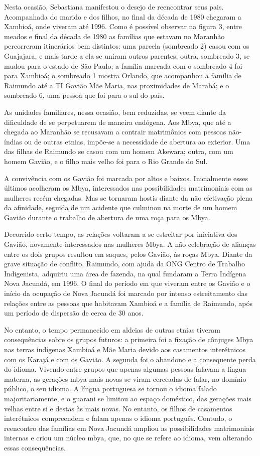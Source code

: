 Nesta ocasião, Sebastiana manifestou o desejo de reencontrar seus pais.
Acompanhada do marido e dos filhos, no final da década de 1980 chegaram
a Xambioá, onde viveram até 1996. Como é possível observar na figura 3,
entre meados e final da década de 1980 as famílias que estavam no
Maranhão percorreram itinerários bem distintos: uma parcela (sombreado
2) casou com os Guajajara, e mais tarde a ela se uniram outros parentes;
outra, sombreado 3, se mudou para o estado de São Paulo; a família
marcada com o sombreado 4 foi para Xambioá; o sombreado 1 mostra
Orlando, que acompanhou a família de Raimundo até a TI Gavião Mãe Maria,
nas proximidades de Marabá; e o sombreado 6, uma pessoa que foi para o
sul do país.

As unidades familiares, nessa ocasião, bem reduzidas, se veem diante da
dificuldade de se perpetuarem de maneira endógena. Aos Mbya, que até a
chegada ao Maranhão se recusavam a contrair matrimônios com pessoas
não-índias ou de outras etnias, impõe-se a necessidade de abertura ao
exterior. Uma das filhas de Raimundo se casou com um homem Akewara;
outra, com um homem Gavião, e o filho mais velho foi para o Rio Grande
do Sul.

A convivência com os Gavião foi marcada por altos e baixos. Inicialmente
esses últimos acolheram os Mbya, interessados nas possibilidades
matrimoniais com as mulheres recém chegadas. Mas se tornaram hostis
diante da não efetivação plena da afinidade, seguida de um acidente que
culminou na morte de um homem Gavião durante o trabalho de abertura de
uma roça para os Mbya.

Decorrido certo tempo, as relações voltaram a se estreitar por
iniciativa dos Gavião, novamente interessados nas mulheres Mbya. A não
celebração de alianças entre os dois grupos resultou em saques, pelos
Gavião, às roças Mbya. Diante da grave situação de conflito, Raimundo,
com ajuda da ONG Centro de Trabalho Indigenista, adquiriu uma área de
fazenda, na qual fundaram a Terra Indígena Nova Jacundá, em 1996. O
final do período em que viveram entre os Gavião e o início da ocupação
de Nova Jacundá foi marcado por intenso estreitamento das relações entre
as pessoas que habitavam Xambioá e a família de Raimundo, após um
período de dispersão de cerca de 30 anos.

No entanto, o tempo permanecido em aldeias de outras etnias tiveram
consequências sobre os grupos futuros: a primeira foi a fixação de
cônjuges Mbya nas terras indígenas Xambioá e Mãe Maria devido aos
casamentos interétnicos com os Karajá e com os Gavião. A segunda foi o
abandono e a consequente perda do idioma. Vivendo entre grupos que
apenas algumas pessoas falavam a língua materna, as gerações mbya mais
novas se viram cerceadas de falar, no domínio público, o seu idioma. A
língua portuguesa se tornou o idioma falado majoritariamente, e o
guarani se limitou ao espaço doméstico, das gerações mais velhas entre
si e destas às mais novas. No entanto, os filhos de casamentos
interétnicos compreendem e falam apenas o idioma português. Contudo, o
reencontro das famílias em Nova Jacundá ampliou as possibilidades
matrimoniais internas e criou um núcleo mbya, que, no que se refere ao
idioma, vem alterando essas consequências.


